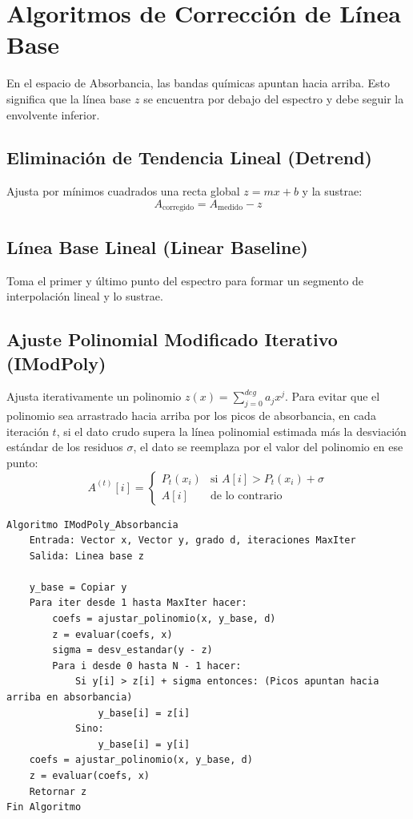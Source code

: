 \documentclass[a4paper,11pt]{article}
\begin{document}
\newpage

\section{Algoritmos de Corrección de Línea Base}
En el espacio de Absorbancia, las bandas químicas apuntan hacia arriba. Esto significa que la línea base $z$ se encuentra por debajo del espectro y debe seguir la envolvente inferior.

\subsection{Eliminación de Tendencia Lineal (Detrend)}
Ajusta por mínimos cuadrados una recta global $z = mx + b$ y la sustrae:
\begin{equation}
    A_{\text{corregido}} = A_{\text{medido}} - z
\end{equation}

\subsection{Línea Base Lineal (Linear Baseline)}
Toma el primer y último punto del espectro para formar un segmento de interpolación lineal y lo sustrae.

\subsection{Ajuste Polinomial Modificado Iterativo (IModPoly)}
Ajusta iterativamente un polinomio $z(x) = \sum_{j=0}^{deg} a_j x^j$. Para evitar que el polinomio sea arrastrado hacia arriba por los picos de absorbancia, en cada iteración $t$, si el dato crudo supera la línea polinomial estimada más la desviación estándar de los residuos $\sigma$, el dato se reemplaza por el valor del polinomio en ese punto:
\begin{equation}
    A^{(t)}[i] = \begin{cases} P_t(x_i) & \text{si } A[i] > P_t(x_i) + \sigma \\ A[i] & \text{de lo contrario} \end{cases}
\end{equation}

\begin{lstlisting}[caption=Algoritmo IModPoly (Absorbancia)]
Algoritmo IModPoly_Absorbancia
    Entrada: Vector x, Vector y, grado d, iteraciones MaxIter
    Salida: Linea base z

    y_base = Copiar y
    Para iter desde 1 hasta MaxIter hacer:
        coefs = ajustar_polinomio(x, y_base, d)
        z = evaluar(coefs, x)
        sigma = desv_estandar(y - z)
        Para i desde 0 hasta N - 1 hacer:
            Si y[i] > z[i] + sigma entonces: (Picos apuntan hacia arriba en absorbancia)
                y_base[i] = z[i]
            Sino:
                y_base[i] = y[i]
    coefs = ajustar_polinomio(x, y_base, d)
    z = evaluar(coefs, x)
    Retornar z
Fin Algoritmo
\end{lstlisting}
\end{document}
